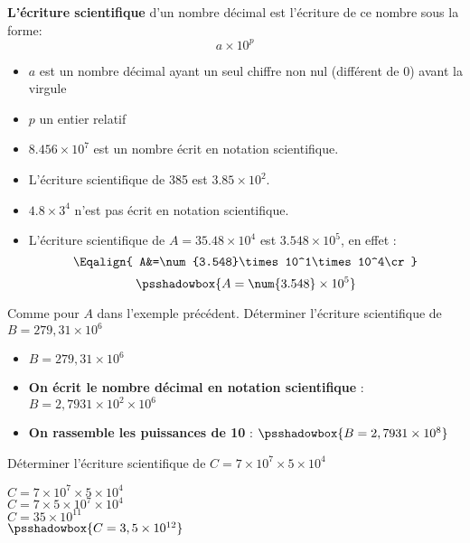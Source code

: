\begin{definition}
\textbf{L'écriture scientifique} d'un nombre décimal est l'écriture de ce nombre sous la forme:
 $$a\times10^p$$
    \begin{itemize}  
        \item $a$ est un nombre décimal ayant un seul chiffre non nul (différent de 0) avant la virgule
        \item $p$ un entier relatif
    \end{itemize}
\end{definition}

\begin{exemples*1}
    \begin{itemize}
        \item $\num{8.456}\times 10^7$ est un nombre écrit en notation scientifique.
        \item L'écriture scientifique de 385 est $\num{3.85}\times10^2$.
        \item $\num{4.8}\times 3^4$ n'est pas écrit en notation scientifique.
        \item  L'écriture scientifique de $A=\num{35.48}\times10^4$ est $\num{3.548}\times10^5$, en effet :
        $$\Eqalign{
        A&=\num{3.548}\times10^1\times10^4\cr
        }$$
        $$\psshadowbox{A=\num{3.548}\times10^5}$$
    \end{itemize}
    
    \smallskip
\end{exemples*1}

\begin{methode*1}
    Comme pour $A$ dans l'exemple précédent.
    \exercice
    Déterminer l'écriture scientifique de $B = 279,31\times10^6$
    \correction
    \begin{itemize}
        \item $B = 279,31\times10^6$
        \item \textbf{On écrit le nombre décimal en notation scientifique} : $B = 2,7931\times 10^2 \times10^6$
        \item \textbf{On rassemble les puissances de 10} : $\psshadowbox{B = 2,7931\times 10^8}$
    \end{itemize}
\end{methode*1}

\begin{methode*1}
    \exercice
    Déterminer l'écriture scientifique de $C=7\times 10^7 \times 5 \times 10^4$
    \correction

    $C=7\times 10^7 \times 5 \times 10^4$\\
    $C=7 \times 5 \times 10^7 \times 10^4$\\
    $C=35 \times 10^{11}$\\ 
    $\psshadowbox{C=3,5 \times 10^{12}}$ 
\end{methode*1}

